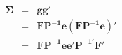 \begin{eqnarray*}
	\bm{\Sigma} &=& \bm{gg'}  \\
	& = & \bm{ F P^{-1} e ( F P^{-1} e) '} \\
	& = & \bm{ FP^{-1} ee' P^{-1'} F' }
\end{eqnarray*}
